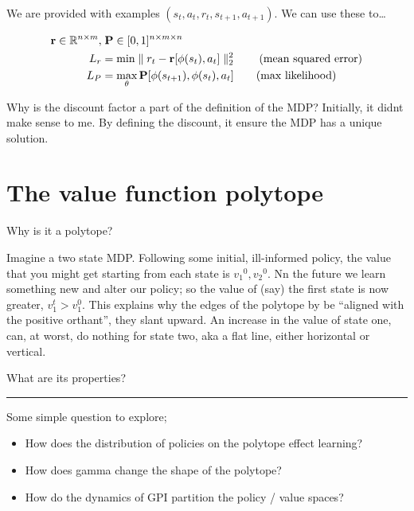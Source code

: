 We are provided with examples \((s_t, a_t, r_t, s_{t+1}, a_{t+1})\). We
can use these to\ldots{}

\begin{align}
\textbf  r \in \mathbb R^{n \times m}, &\; \textbf P \in [0,1]^{n \times m \times n} \\
L_{r} &= \text{min} \parallel r_t - \textbf r[\phi(s_t), a_t] \parallel^2_2 \tag{mean squared error}\\
L_{P} &= \mathop{\text{max}}_{\theta} \textbf P[\phi(s_{t+1}),\phi(s_t), a_t]\tag{max likelihood}\\
\end{align}

Why is the discount factor a part of the definition of the MDP?
Initially, it didnt make sense to me. By defining the discount, it
ensure the MDP has a unique solution.


\section{The value function polytope}

Why is it a polytope?

Imagine a two state MDP. Following some initial, ill-informed policy,
the value that you might get starting from each state is
${v_1}^0, {v_2}^0$. Nn the future we learn something new and alter our
policy; so the value of (say) the first state is now greater,
\(v_1^t > v_1^0\). This explains why the edges of the polytope by be
``aligned with the positive orthant'', they slant upward. An increase in
the value of state one, can, at worst, do nothing for state two, aka a
flat line, either horizontal or vertical.

What are its properties?

\begin{center}\rule{0.5\linewidth}{\linethickness}\end{center}

Some simple question to explore;

\begin{itemize}
\item
  How does the distribution of policies on the polytope effect learning?
\item
  How does gamma change the shape of the polytope?
\item
  How do the dynamics of GPI partition the policy / value spaces?
\end{itemize}

